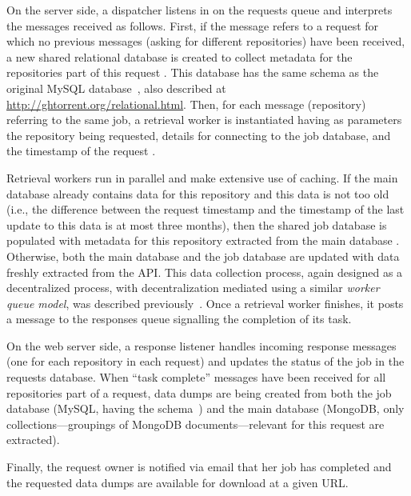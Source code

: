 On the \ght server side, a dispatcher listens in on the requests queue  and interprets the
messages received as follows.
First, if the message refers to a request for which no previous messages (asking for different repositories)
have been received, a new shared relational database is created to collect metadata for the repositories part
of this request .
This database has the same schema as the original \ght MySQL database~\cite{gousios2013ghtorent},
also described at \url{http://ghtorrent.org/relational.html}.
Then, for each message (repository) referring to the same job, a retrieval worker is instantiated having
as parameters the repository being requested, details for connecting to the job database, and the
timestamp of the request .

Retrieval workers run in parallel and make extensive use of caching.
If the main \ght database already contains data for this repository and this data is not too old
(i.e., the difference between the request timestamp and the timestamp of the last update to this data is at
most three months), then the shared job database is populated with metadata for this
repository extracted from the main \ght database . 
Otherwise, both the main \ght database and the job database  are updated with data freshly extracted
from the \gh API.
This data collection process, again designed as a decentralized process, with decentralization mediated
using a similar \emph{worker queue model}, was described previously~\cite{gousios2013ghtorent}.
Once a retrieval worker finishes, it posts a message to the responses queue  signalling
the completion of its task.

On the web server side, a response listener handles incoming response messages (one for each repository
in each request)  and updates the status of the job in the requests database.
When ``task complete'' messages have been received for all repositories part of a request, data dumps
are being created from both the job database (MySQL, having the \ght schema~\cite{gousios2013ghtorent})
and the main \ght database (MongoDB, only collections---groupings of MongoDB documents---relevant for this
request are extracted).

Finally, the request owner is notified via email that her job has completed and the requested data dumps
are available for download at a given URL.

